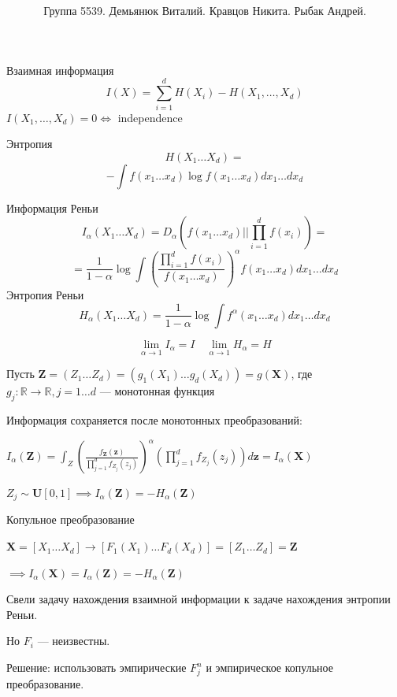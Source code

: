 \documentclass[14pt]{beamer}
\title{
}
\institute{Университет ИТМО}
\author{ Группа 5539. 
Демьянюк Виталий.
Кравцов Никита.
Рыбак Андрей.}
\date{}
\begin{document}
{
\fontsize{14pt}{14pt}\selectfont
{}
\begin{frame}
    \maketitle
\end{frame}
}

\begin{frame}
{Взаимная информация}
$$
I(X) = \sum\limits_{i=1}^{d} H(X_i) - H(X_1, \dots, X_d) 
$$
$
I(X_1, \dots, X_d) = 0  \iff $ independence

Энтропия
$$
H(X_1 \dots X_d) =
$$
$$
- \int f (x_1 \dots x_d) \log f (x_1 \dots x_d) d x_1 \dots d x_d
$$
\end{frame}
\begin{frame}
Информация Реньи
$$
I_{\alpha}  (X_1 \dots X_d)  = D_{\alpha}
\left ( f(x_1 \dots x_d) || \prod\limits_{i=1}^d f(x_i) \right ) =
$$
$$
= \frac{1}{1-\alpha} \log \int
\left ( \frac {\prod_{i=1}^d f(x_i)} {f(x_1 \dots x_d)} \right )^{\alpha}
f(x_1 \dots x_d) d x_1 \dots d x_d
$$
Энтропия Реньи
$$
H_{\alpha}  (X_1 \dots X_d) = \frac{1}{1-\alpha} \log \int
f^{\alpha} (x_1 \dots x_d)  dx_1 \dots dx_d
$$

$$
\lim_{\alpha \to 1} I_{\alpha} = I \quad \lim_{\alpha \to 1} H_{\alpha} = H
$$
\end{frame}

\begin{frame}
    Пусть $ \mathbf Z = (Z_1 \dots Z_d) = (g_1(X_1) \dots g_d(X_d)) = g(\mathbf X)  $, где 
    $ g_j : \mathbb R \to \mathbb R, j = 1 \dots d $ — монотонная функция

    Информация сохраняется после монотонных преобразований:

    $I_\alpha(\mathbf Z) = \int_{Z} \left ( \frac{f_{\mathbf Z}(\mathbf z)}{\prod_{j=1}^d f_{Z_j}(z_j)} \right )^\alpha
    \left ( \prod\limits_{j=1}^d f_{Z_j}(z_j) \right ) d {\mathbf z} = I_\alpha (\mathbf X)
    $
    
    $ Z_j \sim \mathbf U[0,1] \implies I_\alpha (\mathbf Z) = -H_\alpha (\mathbf Z) $
\end{frame}

\begin{frame}
Копульное преобразование

$\mathbf X = [X_1 \dots X_d] \to [F_1(X_1) \dots F_d(X_d)] = [Z_1 \dots Z_d] = \mathbf Z$

$\implies I_\alpha (\mathbf X) = I_\alpha (\mathbf Z) = -H_\alpha (\mathbf Z) $

Свели задачу нахождения взаимной информации к задаче нахождения энтропии Реньи.

Но $F_i$ — неизвестны.

\pause

Решение: использовать эмпирические $F^n_j $ и эмпирическое копульное
преобразование.
\end{frame}
\end{document}
